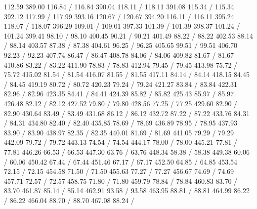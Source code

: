 { 112.59 389.00 116.84 /
 116.84 390.04 118.11 /
 118.11 391.08 115.34 /
 115.34 392.12 117.99 /
 117.99 393.16 120.67 /
 120.67 394.20 116.11 /
 116.11 395.24 118.07 /
 118.07 396.29 109.01 /
 109.01 397.33 101.39 /
 101.39 398.37 101.24 /
 101.24 399.41 98.10 /
 98.10 400.45 90.21 /
 90.21 401.49 88.22 /
 88.22 402.53 88.14 /
 88.14 403.57 87.38 /
 87.38 404.61 96.25 /
 96.25 405.65 99.51 /
 99.51 406.70 92.23 /
 92.23 407.74 86.47 /
 86.47 408.78 84.06 /
 84.06 409.82 81.67 /
 81.67 410.86 83.22 /
 83.22 411.90 78.83 /
 78.83 412.94 79.45 /
 79.45 413.98 75.72 /
 75.72 415.02 81.54 /
 81.54 416.07 81.55 /
 81.55 417.11 84.14 /
 84.14 418.15 84.45 /
 84.45 419.19 80.72 /
 80.72 420.23 79.24 /
 79.24 421.27 83.84 /
 83.84 422.31 82.96 /
 82.96 423.35 84.41 /
 84.41 424.39 85.82 /
 85.82 425.43 85.97 /
 85.97 426.48 82.12 /
 82.12 427.52 79.80 /
 79.80 428.56 77.25 /
 77.25 429.60 82.90 /
 82.90 430.64 83.49 /
 83.49 431.68 86.12 /
 86.12 432.72 87.22 /
 87.22 433.76 84.31 /
 84.31 434.80 82.40 /
 82.40 435.85 78.69 /
 78.69 436.89 78.95 /
 78.95 437.93 83.90 /
 83.90 438.97 82.35 /
 82.35 440.01 81.69 /
 81.69 441.05 79.29 /
 79.29 442.09 79.72 /
 79.72 443.13 74.54 /
 74.54 444.17 78.00 /
 78.00 445.21 77.81 /
 77.81 446.26 66.53 /
 66.53 447.30 63.76 /
 63.76 448.34 58.38 /
 58.38 449.38 60.06 /
 60.06 450.42 67.44 /
 67.44 451.46 67.17 /
 67.17 452.50 64.85 /
 64.85 453.54 72.15 /
 72.15 454.58 71.50 /
 71.50 455.63 77.27 /
 77.27 456.67 74.69 /
 74.69 457.71 72.57 /
 72.57 458.75 71.80 /
 71.80 459.79 78.84 /
 78.84 460.83 83.70 /
 83.70 461.87 85.14 /
 85.14 462.91 93.58 /
 93.58 463.95 88.81 /
 88.81 464.99 86.22 /
 86.22 466.04 88.70 /
 88.70 467.08 88.24 /
}
